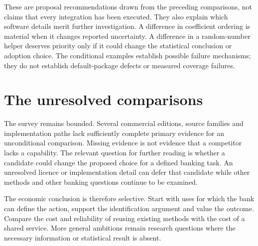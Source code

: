 These are proposal recommendations drawn from the preceding comparisons, not
claims that every integration has been executed. They also explain which
software details merit further investigation. A difference in coefficient
ordering is material when it changes reported uncertainty. A difference in a
random-number helper deserves priority only if it could change the statistical
conclusion or adoption choice. The conditional examples establish possible
failure mechanisms; they do not establish default-package defects or measured
coverage failures.\citep{exec29_panel_inference_sources,exec29_panel_runtime_reference}

\section{The unresolved comparisons}

The survey remains bounded. Several commercial editions, source families and
implementation paths lack sufficiently complete primary evidence for an
unconditional comparison. Missing evidence is not evidence that a competitor
lacks a capability. The relevant question for further reading is whether a
candidate could change the proposed choice for a defined banking task.
An unresolved licence or implementation detail can defer that candidate while
other methods and other banking questions continue to be examined.

The economic conclusion is therefore selective. Start with uses for which the
bank can define the action, support the identification argument and value the
outcome. Compare the cost and reliability of reusing existing methods with the
cost of a shared service. More general ambitions remain research questions
where the necessary information or statistical result is absent.
